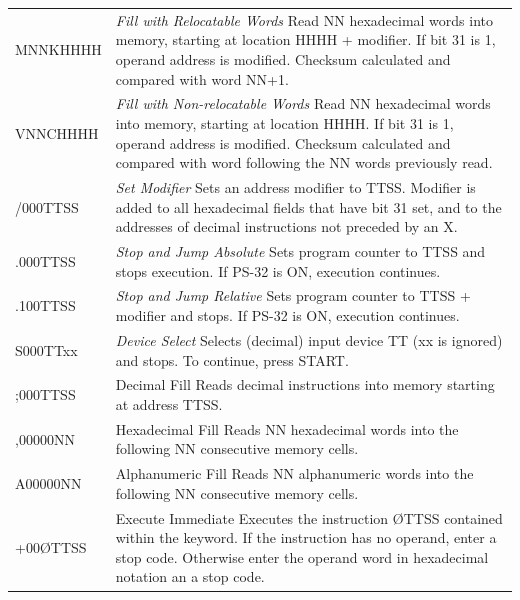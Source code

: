\documentclass{article}
\begin{document}
\begin{enumerate}
\begin{longtable}{l p{11.5cm}}
MNNKHHHH  & \textit{Fill with Relocatable Words} \newline
            Read NN hexadecimal words into memory, starting at location HHHH + modifier. If bit 31 is 1, operand address is modified. Checksum calculated and compared with word NN+1. \\
\addlinespace
VNNCHHHH  & \textit{Fill with Non-relocatable Words} \newline
            Read NN hexadecimal words into memory, starting at location HHHH. If bit 31 is 1, operand address is modified. Checksum calculated and compared with word following the NN words previously read. \\
\addlinespace
/000TTSS  & \textit{Set Modifier} \newline
            Sets an address modifier to TTSS. Modifier is added to all hexadecimal fields that have bit 31 set, and to the addresses of decimal instructions not preceded by an X. \\
\addlinespace
.000TTSS  & \textit{Stop and Jump Absolute} \newline
            Sets program counter to TTSS and stops execution. If PS-32 is ON, execution continues. \\
\addlinespace
.100TTSS  & \textit{Stop and Jump Relative} \newline
            Sets program counter to TTSS + modifier and stops. If PS-32 is ON, execution continues. \\
\addlinespace
S000TTxx  & \textit{Device Select} \newline
            Selects (decimal) input device TT (xx is ignored) and stops. To continue, press START. \\
\addlinespace
;000TTSS  & Decimal Fill \newline
            Reads decimal instructions into memory starting at address TTSS. \\
\addlinespace
,00000NN  & Hexadecimal Fill \newline
            Reads NN hexadecimal words into the following NN consecutive memory cells. \\
\addlinespace
A00000NN  & Alphanumeric Fill \newline
            Reads NN alphanumeric words into the following NN consecutive memory cells. \\
\addlinespace
+00ØTTSS  & Execute Immediate \newline
            Executes the instruction ØTTSS contained within the keyword. If the instruction has no operand, enter a stop code. Otherwise enter the operand word in hexadecimal notation an a stop code. \\

\end{longtable}
\end{enumerate}
\end{document}
